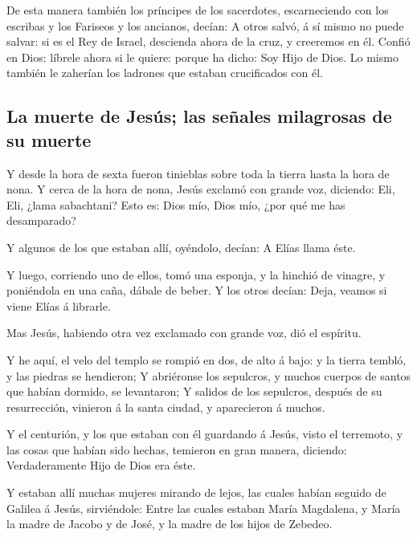  De esta manera también los príncipes de los sacerdotes,
escarneciendo con los escribas y los Fariseos y los ancianos, decían:
 A otros salvó, á sí mismo no puede salvar: si es el Rey de
Israel, descienda ahora de la cruz, y creeremos en él. 
Confió en Dios: líbrele ahora si le quiere: porque ha dicho: Soy Hijo de
Dios.  Lo mismo también le zaherían los ladrones que
estaban crucificados con él.

\hypertarget{la-muerte-de-jesuxfas-las-seuxf1ales-milagrosas-de-su-muerte}{%
\subsection{La muerte de Jesús; las señales milagrosas de su
muerte}\label{la-muerte-de-jesuxfas-las-seuxf1ales-milagrosas-de-su-muerte}}

 Y desde la hora de sexta fueron tinieblas sobre toda la
tierra hasta la hora de nona.  Y cerca de la hora de nona,
Jesús exclamó con grande voz, diciendo: Eli, Eli, ¿lama sabachtani? Esto
es: Dios mío, Dios mío, ¿por qué me has desamparado?

 Y algunos de los que estaban allí, oyéndolo, decían: A
Elías llama éste.

 Y luego, corriendo uno de ellos, tomó una esponja, y la
hinchió de vinagre, y poniéndola en una caña, dábale de beber.
 Y los otros decían: Deja, veamos si viene Elías á
librarle.

 Mas Jesús, habiendo otra vez exclamado con grande voz, dió
el espíritu.

 Y he aquí, el velo del templo se rompió en dos, de alto á
bajo: y la tierra tembló, y las piedras se hendieron;  Y
abriéronse los sepulcros, y muchos cuerpos de santos que habían dormido,
se levantaron;  Y salidos de los sepulcros, después de su
resurrección, vinieron á la santa ciudad, y aparecieron á muchos.

 Y el centurión, y los que estaban con él guardando á
Jesús, visto el terremoto, y las cosas que habían sido hechas, temieron
en gran manera, diciendo: Verdaderamente Hijo de Dios era éste.

 Y estaban allí muchas mujeres mirando de lejos, las cuales
habían seguido de Galilea á Jesús, sirviéndole:  Entre las
cuales estaban María Magdalena, y María la madre de Jacobo y de José, y
la madre de los hijos de Zebedeo.


